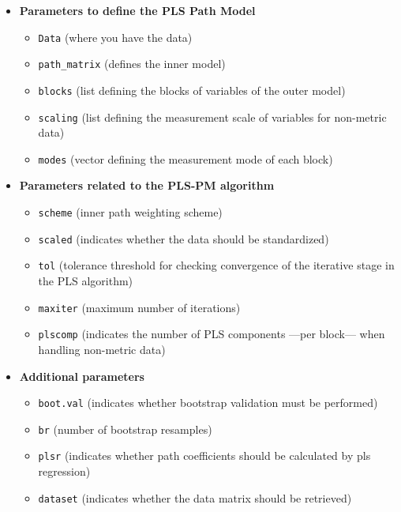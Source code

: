 \documentclass[12pt]{book}\usepackage{graphicx, color}
\newcommand{\code}[1]{\texttt{#1}}
\begin{document}
\begin{itemize}
 \item \textbf{Parameters to define the PLS Path Model}
  \begin{itemize}
   \item[] \code{Data} (where you have the data)
   \item[] \code{path\_matrix} (defines the inner model)
   \item[] \code{blocks} (list defining the blocks of variables of the outer model)
   \item[] \code{scaling} (list defining the measurement scale of variables for non-metric data)
   \item[] \code{modes} (vector defining the measurement mode of each block)
  \end{itemize}

 \item \textbf{Parameters related to the PLS-PM algorithm}
  \begin{itemize}
   \item[] \code{scheme} (inner path weighting scheme)
   \item[] \code{scaled} (indicates whether the data should be standardized)
   \item[] \code{tol} (tolerance threshold for checking convergence of the iterative stage in the PLS algorithm)
   \item[] \code{maxiter} (maximum number of iterations)
   \item[] \code{plscomp} (indicates the number of PLS components ---per block--- when handling non-metric data)
  \end{itemize}

 \item \textbf{Additional parameters}
  \begin{itemize}
   \item[] \code{boot.val} (indicates whether bootstrap validation must be performed)
   \item[] \code{br} (number of bootstrap resamples)
   \item[] \code{plsr} (indicates whether path coefficients should be calculated by pls regression)
   \item[] \code{dataset} (indicates whether the data matrix should be retrieved)
  \end{itemize}
\end{itemize}
 
\end{document}
